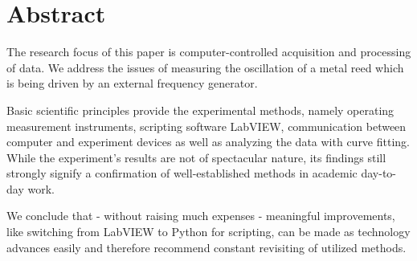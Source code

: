 \section*{Abstract}

The research focus of this paper is computer-controlled acquisition and processing of data.
We address the issues of measuring the oscillation of a metal reed which is being driven by an external frequency generator.

Basic scientific principles provide the experimental methods, namely operating measurement instruments, scripting software LabVIEW, communication between computer and experiment devices as well as analyzing the data with curve fitting.
While the experiment's results are not of spectacular nature, its findings still strongly signify a confirmation of well-established methods in academic day-to-day work.

We conclude that - without raising much expenses - meaningful improvements, like switching from LabVIEW to Python for scripting, can be made as technology advances easily and therefore recommend constant revisiting of utilized methods.

\vspace{5mm}
